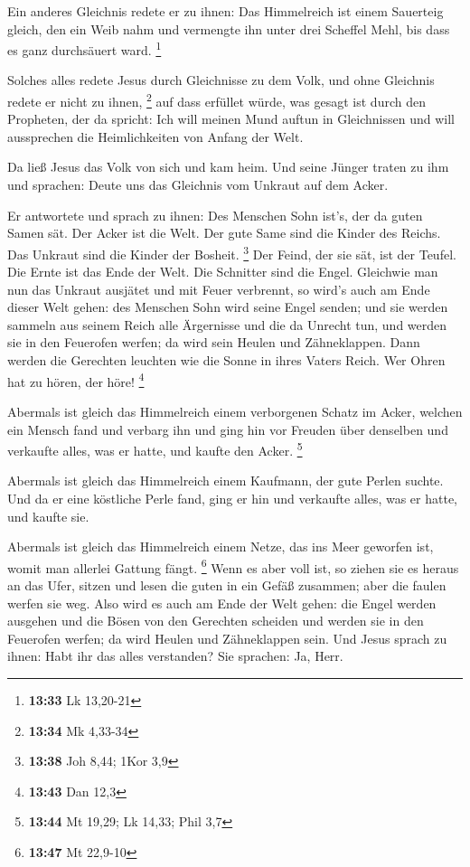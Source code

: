  Ein anderes Gleichnis redete er zu ihnen: Das
Himmelreich ist einem Sauerteig gleich, den ein Weib nahm und vermengte
ihn unter drei Scheffel Mehl, bis dass es ganz durchsäuert ward.
\footnote{\textbf{13:33} Lk 13,20-21}

 Solches alles redete Jesus durch Gleichnisse zu dem
Volk, und ohne Gleichnis redete er nicht zu ihnen, \footnote{\textbf{13:34}
  Mk 4,33-34}  auf dass erfüllet würde, was gesagt ist
durch den Propheten, der da spricht: Ich will meinen Mund auftun in
Gleichnissen und will aussprechen die Heimlichkeiten von Anfang der
Welt.

 Da ließ Jesus das Volk von sich und kam heim. Und seine
Jünger traten zu ihm und sprachen: Deute uns das Gleichnis vom Unkraut
auf dem Acker.

 Er antwortete und sprach zu ihnen: Des Menschen Sohn
ist's, der da guten Samen sät.  Der Acker ist die Welt.
Der gute Same sind die Kinder des Reichs. Das Unkraut sind die Kinder
der Bosheit. \footnote{\textbf{13:38} Joh 8,44; 1Kor 3,9}
 Der Feind, der sie sät, ist der Teufel. Die Ernte ist
das Ende der Welt. Die Schnitter sind die Engel. 
Gleichwie man nun das Unkraut ausjätet und mit Feuer verbrennt, so
wird's auch am Ende dieser Welt gehen:  des Menschen Sohn
wird seine Engel senden; und sie werden sammeln aus seinem Reich alle
Ärgernisse und die da Unrecht tun,  und werden sie in den
Feuerofen werfen; da wird sein Heulen und Zähneklappen. 
Dann werden die Gerechten leuchten wie die Sonne in ihres Vaters Reich.
Wer Ohren hat zu hören, der höre! \footnote{\textbf{13:43} Dan 12,3}

 Abermals ist gleich das Himmelreich einem verborgenen
Schatz im Acker, welchen ein Mensch fand und verbarg ihn und ging hin
vor Freuden über denselben und verkaufte alles, was er hatte, und kaufte
den Acker. \footnote{\textbf{13:44} Mt 19,29; Lk 14,33; Phil 3,7}

 Abermals ist gleich das Himmelreich einem Kaufmann, der
gute Perlen suchte.  Und da er eine köstliche Perle fand,
ging er hin und verkaufte alles, was er hatte, und kaufte sie.

 Abermals ist gleich das Himmelreich einem Netze, das ins
Meer geworfen ist, womit man allerlei Gattung fängt. \footnote{\textbf{13:47}
  Mt 22,9-10}  Wenn es aber voll ist, so ziehen sie es
heraus an das Ufer, sitzen und lesen die guten in ein Gefäß zusammen;
aber die faulen werfen sie weg.  Also wird es auch am
Ende der Welt gehen: die Engel werden ausgehen und die Bösen von den
Gerechten scheiden  und werden sie in den Feuerofen
werfen; da wird Heulen und Zähneklappen sein.  Und Jesus
sprach zu ihnen: Habt ihr das alles verstanden? Sie sprachen: Ja, Herr.

